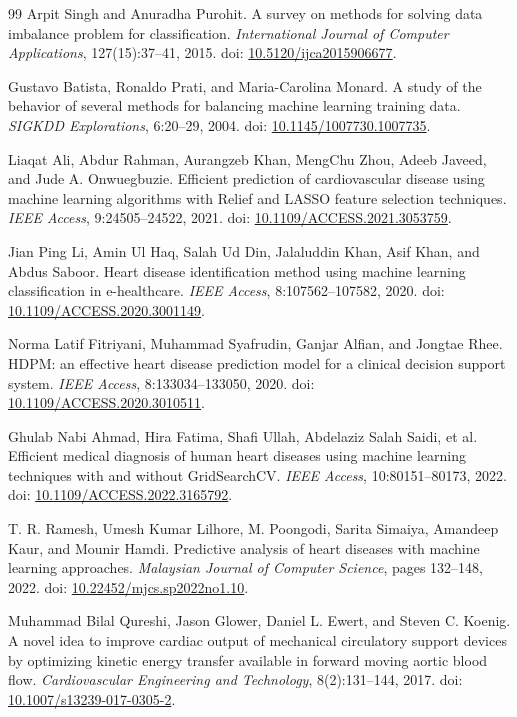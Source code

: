 \begin{thebibliography}{99}
 Arpit Singh and Anuradha Purohit. A survey on methods for solving data imbalance problem for classification. \emph{International Journal of Computer Applications}, 127(15):37--41, 2015. doi: \href{https://doi.org/10.5120/ijca2015906677}{10.5120/ijca2015906677}.

 Gustavo Batista, Ronaldo Prati, and Maria-Carolina Monard. A study of the behavior of several methods for balancing machine learning training data. \emph{SIGKDD Explorations}, 6:20--29, 2004. doi: \href{https://doi.org/10.1145/1007730.1007735}{10.1145/1007730.1007735}.

 Liaqat Ali, Abdur Rahman, Aurangzeb Khan, MengChu Zhou, Adeeb Javeed, and Jude A. Onwuegbuzie. Efficient prediction of cardiovascular disease using machine learning algorithms with Relief and LASSO feature selection techniques. \emph{IEEE Access}, 9:24505--24522, 2021. doi: \href{https://doi.org/10.1109/ACCESS.2021.3053759}{10.1109/ACCESS.2021.3053759}.

 Jian Ping Li, Amin Ul Haq, Salah Ud Din, Jalaluddin Khan, Asif Khan, and Abdus Saboor. Heart disease identification method using machine learning classification in e-healthcare. \emph{IEEE Access}, 8:107562--107582, 2020. doi: \href{https://doi.org/10.1109/ACCESS.2020.3001149}{10.1109/ACCESS.2020.3001149}.

 Norma Latif Fitriyani, Muhammad Syafrudin, Ganjar Alfian, and Jongtae Rhee. HDPM: an effective heart disease prediction model for a clinical decision support system. \emph{IEEE Access}, 8:133034--133050, 2020. doi: \href{https://doi.org/10.1109/ACCESS.2020.3010511}{10.1109/ACCESS.2020.3010511}.

 Ghulab Nabi Ahmad, Hira Fatima, Shafi Ullah, Abdelaziz Salah Saidi, et al. Efficient medical diagnosis of human heart diseases using machine learning techniques with and without GridSearchCV. \emph{IEEE Access}, 10:80151--80173, 2022. doi: \href{https://doi.org/10.1109/ACCESS.2022.3165792}{10.1109/ACCESS.2022.3165792}.

 T. R. Ramesh, Umesh Kumar Lilhore, M. Poongodi, Sarita Simaiya, Amandeep Kaur, and Mounir Hamdi. Predictive analysis of heart diseases with machine learning approaches. \emph{Malaysian Journal of Computer Science}, pages 132--148, 2022. doi: \href{https://doi.org/10.22452/mjcs.sp2022no1.10}{10.22452/mjcs.sp2022no1.10}.

 Muhammad Bilal Qureshi, Jason Glower, Daniel L. Ewert, and Steven C. Koenig. A novel idea to improve cardiac output of mechanical circulatory support devices by optimizing kinetic energy transfer available in forward moving aortic blood flow. \emph{Cardiovascular Engineering and Technology}, 8(2):131--144, 2017. doi: \href{https://doi.org/10.1007/s13239-017-0305-2}{10.1007/s13239-017-0305-2}.


\end{thebibliography}
